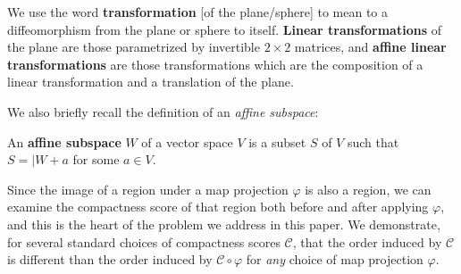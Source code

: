 \begin{definition}
We use the word \textbf{transformation} [of the plane/sphere] to mean
to a diffeomorphism from the plane or sphere to itself.
\textbf{Linear transformations} of the plane are those parametrized by
invertible $2{\times}2$ matrices, and \textbf{affine linear
transformations} are those transformations which are the composition
of a linear transformation and a translation of the plane.
\end{definition}
We also briefly recall the definition of an \textit{affine subspace}:
\begin{definition}
	An \textbf{affine subspace} $W$ of a vector space $V$ 
   is a subset $S$ of $V$ such 
  that $S = \vert W + a$ for some $a\in V$.
\end{definition}

Since the image of a region under a map projection $\varphi$ is also
a region, we can examine the compactness score of that region both 
before and after applying $\varphi$, and this is the heart of the
problem we address in this paper.  We demonstrate, for several
standard choices of compactness scores $\mathcal{C}$, that the order
induced by $\mathcal{C}$ is different than the order induced by
$\mathcal{C}\circ\varphi$ for \textit{any} choice of map projection
$\varphi$.
